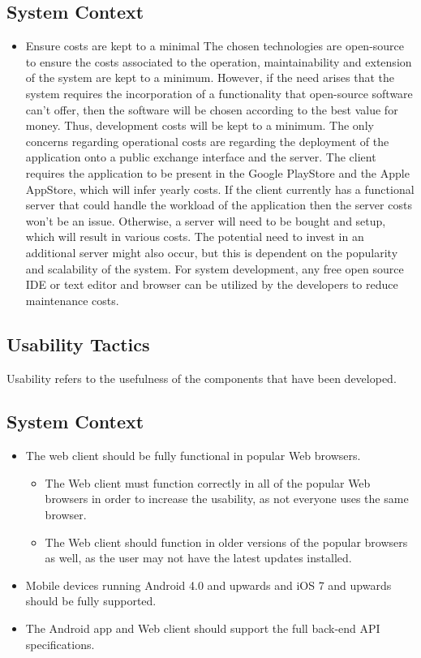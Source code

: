 \documentclass[11pt,fleqn]{book} %
\begin{document}
	\subsection{System Context}
	\begin{itemize}
		\item Ensure costs are kept to a minimal \newline\newline
		The chosen technologies are open-source to ensure the costs associated to the operation, maintainability and extension of the system are kept to a minimum. However, if the need arises that the system requires the incorporation of a functionality that open-source software can’t offer, then the software will be chosen according to the best value for money. Thus, development costs will be kept to a minimum. The only concerns regarding operational costs are regarding the deployment of the application onto a public exchange interface and the server. The client requires the application to be present in the Google PlayStore and the Apple AppStore, which will infer yearly costs. If the client currently has a functional server that could handle the workload of the application then the server costs won’t be an issue. Otherwise, a server will need to be bought and setup, which will result in various costs. The potential need to invest in an additional server might also occur, but this is dependent on the popularity and scalability of the system. For system development, any free open source IDE or text editor and browser can be utilized by the developers to reduce maintenance costs.
		
	\end{itemize}
	
	\subsection{Usability Tactics}
	Usability refers to the usefulness of the components that have been developed.
	\subsection{System Context}
	\begin{itemize}		
		\item The web client should be fully functional in popular Web browsers.
		\begin{itemize}
			\item The Web client must function correctly in all of the popular Web browsers in order to increase the usability, as not everyone uses the same browser.
			\item The Web client should function in older versions of the popular browsers as well, as the user may not have the latest updates installed.
		\end{itemize}
		\item Mobile devices running Android 4.0 and upwards and iOS 7 and upwards should be fully supported.
		\item The Android app and Web client should support the full back-end API specifications.
	\end{itemize}
	
\end{document}
